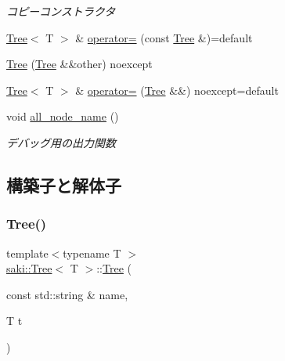 \begin{DoxyCompactItemize}
\begin{DoxyCompactList}\small\item\em コピーコンストラクタ \end{DoxyCompactList}\item 
\mbox{\hyperlink{classsaki_1_1_tree}{Tree}}$<$ T $>$ \& \mbox{\hyperlink{classsaki_1_1_tree_ab5f73b5b7cee4f70663d03803401547b}{operator=}} (const \mbox{\hyperlink{classsaki_1_1_tree}{Tree}} \&)=default
\item 
\mbox{\hyperlink{classsaki_1_1_tree_ad26ec9d86d0ed3f360c88ea4342b726f}{Tree}} (\mbox{\hyperlink{classsaki_1_1_tree}{Tree}} \&\&other) noexcept
\item 
\mbox{\hyperlink{classsaki_1_1_tree}{Tree}}$<$ T $>$ \& \mbox{\hyperlink{classsaki_1_1_tree_a71749080c165c790b38596e5c0c151df}{operator=}} (\mbox{\hyperlink{classsaki_1_1_tree}{Tree}} \&\&) noexcept=default
\item 
void \mbox{\hyperlink{classsaki_1_1_tree_a1a2c7a0f165de86065bddd676cca6f15}{all\+\_\+node\+\_\+name}} ()
\begin{DoxyCompactList}\small\item\em デバッグ用の出力関数 \end{DoxyCompactList}\end{DoxyCompactItemize}


\subsection{構築子と解体子}
\mbox{\label{classsaki_1_1_tree_a3b755ca793a3e3c9dd6e0aee77bf7bd6}} 
\subsubsection{\texorpdfstring{Tree()}{Tree()}\hspace{0.1cm}{\footnotesize\ttfamily [1/3]}}
{\footnotesize\ttfamily template$<$typename T $>$ \\
\mbox{\hyperlink{classsaki_1_1_tree}{saki\+::\+Tree}}$<$ T $>$\+::\mbox{\hyperlink{classsaki_1_1_tree}{Tree}} (\begin{DoxyParamCaption}\item[{const std\+::string \&}]{name,  }\item[{T}]{t }\end{DoxyParamCaption})\hspace{0.3cm}{\ttfamily [inline]}}



